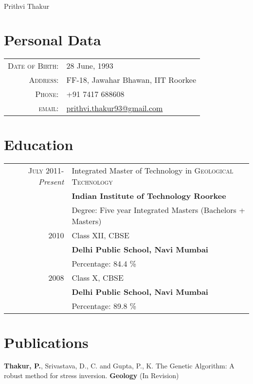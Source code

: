 \documentclass[a4paper,10pt]{article}
\begin{document}
\pagestyle{empty} %


\par{\centering
		{\Huge Prithvi Thakur
	}\bigskip\par}



\section{Personal Data}
\begin{tabular}{rl}
    \textsc{Date of Birth:} & 28 June, 1993 \\
    \textsc{Address:}   & FF-18, Jawahar Bhawan, IIT Roorkee \\
    \textsc{Phone:}     & +91 7417 688608\\
    \textsc{email:}     & \href{mailto:prithvi.thakur93@gmail.com}{prithvi.thakur93@gmail.com}\\
\end{tabular}

\section{Education}
\begin{tabular}{rl}	
 \textsc{July 2011-} \emph{Present} & Integrated Master of Technology in \textsc{Geological Technology} \\ & \textbf{Indian Institute of Technology Roorkee}\\
 & Degree: Five year Integrated Masters (Bachelors + Masters)\\

\textsc{2010} & Class XII, CBSE \\ & \textbf{Delhi Public School, Navi Mumbai}\\ & Percentage: 84.4 \%  \\

\textsc{2008} & Class X, CBSE \\ & \textbf{Delhi Public School, Navi Mumbai}\\ & Percentage: 89.8 \% 

\end{tabular}

\section{Publications}
\textbf{Thakur, P.}, Srivastava, D., C. and Gupta, P., K. The Genetic Algorithm: A robust method for stress inversion. \textbf{Geology} (In Revision)
\end{document}
